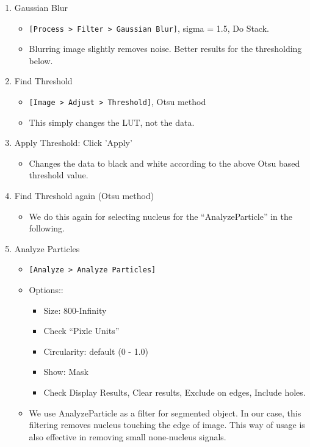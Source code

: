 \documentclass[11pt,a4paper,oneside]{report}
\newcommand{\ijmenu}[1]{\texttt{\small#1}}
\begin{document}
\begin{enumerate}
  \item Gaussian Blur
  \begin{itemize}
    \item \ijmenu{[Process > Filter > Gaussian Blur]}, sigma = 1.5, Do Stack.
    \item Blurring image slightly removes noise. Better results for the thresholding below.  
  \end{itemize}
  \item Find Threshold
  \begin{itemize}
    \item \ijmenu{[Image > Adjust > Threshold]},  Otsu method
    \item This simply changes the LUT, not the data. 
  \end{itemize}
  \item Apply Threshold: Click 'Apply'
  \begin{itemize}
    \item Changes the data to black and white according to the above Otsu based threshold value. 
  \end{itemize}
  \item Find Threshold again (Otsu method)
  \begin{itemize}
    \item We do this again for selecting nucleus for the ``AnalyzeParticle'' in the following.
  \end{itemize}
  \item Analyze Particles
  \begin{itemize}
    \item \ijmenu{[Analyze > Analyze Particles]}
    \item Options::
    \begin{itemize}
      \item Size: 800-Infinity
      \item Check ``Pixle Units''
      \item Circularity: default (0 - 1.0)
      \item Show: Mask
      \item Check Display Results, Clear results, Exclude on edges, Include holes. 
    \end{itemize}
    \item We use AnalyzeParticle as a filter for segmented object. In our case, this filtering removes nucleus touching the edge of image. This way of usage is also effective in removing small none-nucleus signals. 
  \end{itemize}

\end{enumerate}
\end{document}
